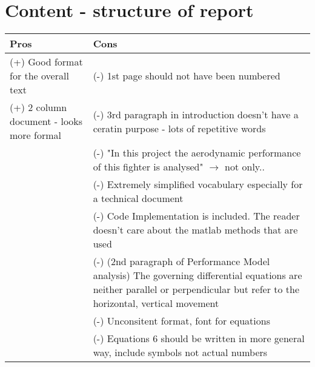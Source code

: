 \section{Content -  structure of report}


\begin{table}[H]
  \centering
    \begin{tabular}{p{7cm}|p{7cm}}
    \toprule
    \textbf{Pros} & \textbf{Cons} \\
    \midrule
    (+) Good format for the overall text & (-) 1st page should not have been numbered \\
    (+) 2 column document - looks more formal & (-) 3rd paragraph in introduction doesn’t have a ceratin purpose - lots of repetitive words \\
          & (-) "In this project the aerodynamic performance of this fighter is analysed" $\rightarrow$ not only.. \\
          & (-) Extremely simplified vocabulary especially for a technical document \\
          & (-) Code Implementation is included. The reader doesn't care about the matlab methods that are used \\
          & (-) (2nd paragraph of Performance Model analysis) The governing differential equations are neither parallel or perpendicular but refer to the horizontal, vertical movement \\
          & (-) Unconsitent format, font for equations \\
          & (-) Equations 6 should be written in more general way, include symbols not actual numbers \\
    \bottomrule
    \end{tabular}%
\end{table}%


